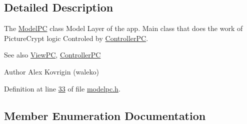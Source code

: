 \subsection{Detailed Description}
The \hyperlink{class_model_p_c}{Model\+PC} class Model Layer of the app. Main class that does the work of Picture\+Crypt logic Controled by \hyperlink{class_controller_p_c}{Controller\+PC}. 

\begin{DoxySeeAlso}{See also}
\hyperlink{class_view_p_c}{View\+PC}, \hyperlink{class_controller_p_c}{Controller\+PC} 
\end{DoxySeeAlso}
\begin{DoxyAuthor}{Author}
Alex Kovrigin (waleko) 
\end{DoxyAuthor}


Definition at line \hyperlink{modelpc_8h_source_l00033}{33} of file \hyperlink{modelpc_8h_source}{modelpc.\+h}.



\subsection{Member Enumeration Documentation}

